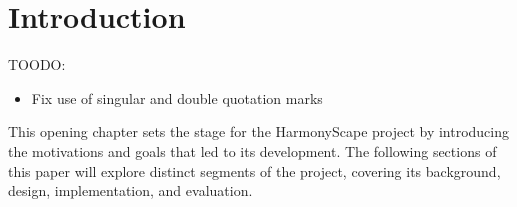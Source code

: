 \documentclass{l4proj}
\begin{document}
%
%
%
%
%
%
%
%
\chapter{Introduction}



TOODO: \begin{itemize}
    \item Fix use of singular and double quotation marks
\end{itemize}


This opening chapter sets the stage for the HarmonyScape project by introducing the motivations and goals that led to its development. The following sections of this paper will explore distinct segments of the project, covering its background, design, implementation, and evaluation.
\end{document}

